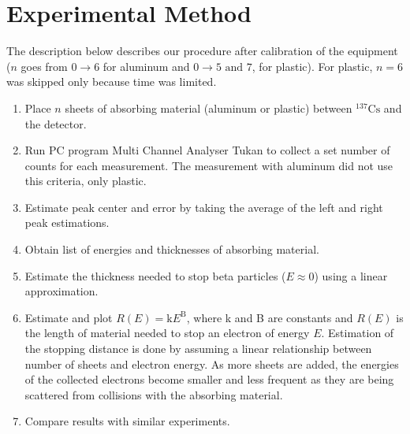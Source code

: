 
\section{Experimental Method} %
\label{sec:experimental_method}

The description below describes our procedure after calibration of the equipment ($n$ goes from $ 0 \to 6$ for aluminum and $0 \to 5 \text{~and~} 7$, for plastic). For plastic, $n=6$ was skipped only because time was limited.   
\begin{enumerate}
	\item Place $n$ sheets of absorbing material (aluminum or plastic) between $^{137}\text{Cs}$ and the detector.
	\item Run PC program Multi Channel Analyser Tukan to collect a set number of counts for each measurement. The measurement with aluminum did not use this criteria, only plastic.
	\item Estimate peak center and error by taking the average of the left and right peak estimations.
	\item Obtain list of energies and thicknesses of absorbing material.
	\item Estimate the thickness needed to stop beta particles ($E\approx0$) using a linear approximation.
	\item Estimate and plot $R(E)=\text{k}E^{\text{B}}$, where k and B are constants and $R(E)$ is the length of material needed to stop an electron of energy $E$.
    Estimation of the stopping distance is done by assuming a linear relationship between number of sheets and electron energy.  As more sheets are added, the energies of the collected electrons become smaller and less frequent as they are being scattered from collisions with the absorbing material.
	\item Compare results with similar experiments.\cite{RevModPhys.24.28,nistData}
\end{enumerate}%

